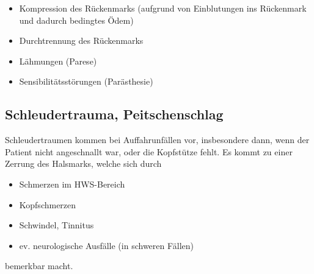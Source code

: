 \begin{itemize}
    \item Kompression des R\"uckenmarks (aufgrund von Einblutungen ins  R\"uckenmark und dadurch bedingtes Ödem) 
    \item Durchtrennung des R\"uckenmarks
    \item L\"ahmungen (Parese)
    \item Sensibilit\"atsst\"orungen (Par\"asthesie)
\end{itemize}


\subsection{Schleudertrauma, Peitschenschlag}

Schleudertraumen kommen bei Auffahrunf\"allen vor, insbesondere dann, wenn der Patient nicht angeschnallt war, oder die Kopfstütze fehlt. Es kommt zu einer Zerrung des Halsmarks, welche sich durch
\begin{itemize}
	\item Schmerzen im HWS-Bereich
	\item Kopfschmerzen
	\item Schwindel, Tinnitus
	\item ev. neurologische Ausfälle (in schweren Fällen)
\end{itemize}
bemerkbar macht.

